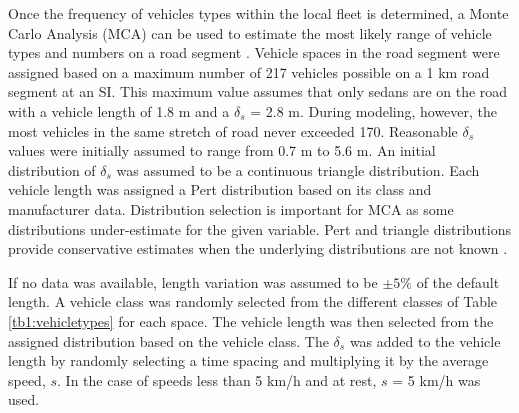 \begin{table}[H]
\centering
\caption{Vehicle classes.}
\label{tb1:vehicletypes}
\end{table}

Once the frequency of vehicles types within the local fleet is determined, a Monte Carlo Analysis (MCA) can be used to estimate the most likely range of vehicle types and numbers on a road segment \citep{Freeman2015b}. Vehicle spaces in the road segment were assigned based on a maximum number of 217 vehicles possible on a 1 km road segment at an SI.  This maximum value assumes that only sedans are on the road with a vehicle length of 1.8 m and a $\delta_{s}$ = 2.8 m.  During modeling, however, the most vehicles in the same stretch of road never exceeded 170.  Reasonable $\delta_{s}$ values were initially assumed to range from 0.7 m to 5.6 m. An initial distribution of $\delta_{s}$ was assumed to be a continuous triangle distribution. Each vehicle length was assigned a Pert distribution based on its class and manufacturer data. Distribution selection is important for MCA as some distributions under-estimate for the given variable. Pert and triangle distributions provide conservative estimates when the underlying distributions are not known \citep{Freeman2018}. 

If no data was available, length variation was assumed to be $\pm5\%$ of the default length. A vehicle class was randomly selected from the different classes of Table \ref{tb1:vehicletypes} for each space.  The vehicle length was then selected from the assigned distribution based on the vehicle class.  The $\delta_{s}$ was added to the vehicle length by randomly selecting a time spacing and multiplying it by the average speed, $s$. In the case of speeds less than 5 km/h and at rest, $s$ = 5 km/h was used.  

